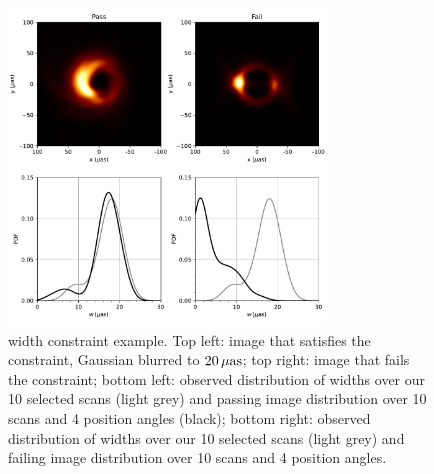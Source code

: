 \begin{figure}
  \centering
  \includegraphics[width=0.75\textwidth]{figures/mring_width_example.pdf}
  \caption{\Mring width constraint example.  Top left: image that satisfies the constraint, Gaussian blurred to $20\,\mathrm{\mu as}$; top right: image that fails the constraint; bottom left: observed distribution of \mring widths over our 10 selected scans (light grey) and passing image distribution over 10 scans and 4 position angles (black); bottom right: observed distribution of \mring widths over our 10 selected scans (light grey) and failing image distribution over 10 scans and 4 position angles.
  }
  \label{fig:mring_width_example}
\end{figure}



